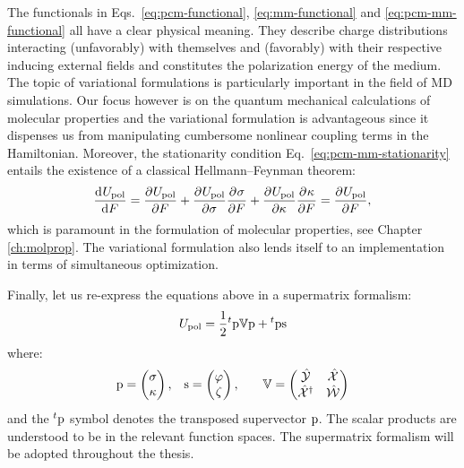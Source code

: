 The functionals in Eqs.~\eqref{eq:pcm-functional},
\eqref{eq:mm-functional} and \eqref{eq:pcm-mm-functional} all have a
clear physical meaning.
They describe charge distributions interacting (unfavorably) with
themselves and (favorably) with their respective inducing external
fields and constitutes the polarization energy of the medium.
The topic of variational formulations is particularly important in the
field of \acrshort{MD} simulations.\autocite{Jadhao2012-gf, Jadhao2013-ry, Jadhao2013-hs,
Solis2013-ef}
Our focus however is on the quantum mechanical calculations of molecular
properties and the variational formulation is advantageous since it
dispenses us from manipulating cumbersome nonlinear coupling terms in
the Hamiltonian.
Moreover, the stationarity condition Eq.~\ref{eq:pcm-mm-stationarity}
entails the existence of a classical Hellmann--Feynman theorem:
\begin{equation}\label{eq:classical-HF}
  \frac{\mathop{}\!\mathrm{d}^{}U_\mathrm{pol}}{\mathop{}\!\mathrm{d} F^{}} = \frac{\partial^{}U_\mathrm{pol}} {\partial F^{}}
  + \frac{\partial^{}U_\mathrm{pol}} {\partial \sigma^{}}\frac{\partial^{}\sigma} {\partial F^{}}
  + \frac{\partial^{}U_\mathrm{pol}} {\partial \kappa^{}}\frac{\partial^{}\kappa} {\partial F^{}}
  = \frac{\partial^{}U_\mathrm{pol}} {\partial F^{}},
\end{equation}
which is paramount in the formulation of molecular properties, see
Chapter \ref{ch:molprop}.
The variational formulation also lends itself to an implementation
in terms of simultaneous optimization.\autocite{Lipparini2011-aj}

Finally, let us re-express the equations above in a supermatrix
formalism:
\begin{equation}\label{eq:supermatrix-functional}
  U_\mathrm{pol} =
  \frac{1}{2}{}^t\mathrm{p}\mathbb{V}\mathrm{p} + {}^t\mathrm{p}\mathrm{s}
\end{equation}
where:
\begin{alignat}{3}
  \mathrm{p} =
  \begin{pmatrix}
    \sigma \\
    \kappa
  \end{pmatrix},
  \quad&
  \mathrm{s} =
  \begin{pmatrix}
   \varphi \\
   \zeta
  \end{pmatrix},
  \quad&
  \mathbb{V} =
  \begin{pmatrix}
    \hat{\mathcal{Y}} & \hat{\mathcal{X}} \\
    \hat{\mathcal{X}}^\dagger & \hat{\mathcal{W}}
  \end{pmatrix}
\end{alignat}
and the ${}^t\mathrm{p}$ symbol denotes the transposed supervector $\mathrm{p}$.
The scalar products are understood to be in the relevant function
spaces.
The supermatrix formalism will be adopted throughout the thesis.

